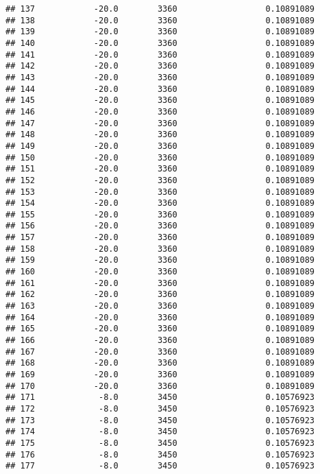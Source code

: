 \documentclass[]{article}
\begin{document}
\begin{verbatim}
## 137            -20.0        3360                  0.10891089
## 138            -20.0        3360                  0.10891089
## 139            -20.0        3360                  0.10891089
## 140            -20.0        3360                  0.10891089
## 141            -20.0        3360                  0.10891089
## 142            -20.0        3360                  0.10891089
## 143            -20.0        3360                  0.10891089
## 144            -20.0        3360                  0.10891089
## 145            -20.0        3360                  0.10891089
## 146            -20.0        3360                  0.10891089
## 147            -20.0        3360                  0.10891089
## 148            -20.0        3360                  0.10891089
## 149            -20.0        3360                  0.10891089
## 150            -20.0        3360                  0.10891089
## 151            -20.0        3360                  0.10891089
## 152            -20.0        3360                  0.10891089
## 153            -20.0        3360                  0.10891089
## 154            -20.0        3360                  0.10891089
## 155            -20.0        3360                  0.10891089
## 156            -20.0        3360                  0.10891089
## 157            -20.0        3360                  0.10891089
## 158            -20.0        3360                  0.10891089
## 159            -20.0        3360                  0.10891089
## 160            -20.0        3360                  0.10891089
## 161            -20.0        3360                  0.10891089
## 162            -20.0        3360                  0.10891089
## 163            -20.0        3360                  0.10891089
## 164            -20.0        3360                  0.10891089
## 165            -20.0        3360                  0.10891089
## 166            -20.0        3360                  0.10891089
## 167            -20.0        3360                  0.10891089
## 168            -20.0        3360                  0.10891089
## 169            -20.0        3360                  0.10891089
## 170            -20.0        3360                  0.10891089
## 171             -8.0        3450                  0.10576923
## 172             -8.0        3450                  0.10576923
## 173             -8.0        3450                  0.10576923
## 174             -8.0        3450                  0.10576923
## 175             -8.0        3450                  0.10576923
## 176             -8.0        3450                  0.10576923
## 177             -8.0        3450                  0.10576923

\end{verbatim}
\end{document}
